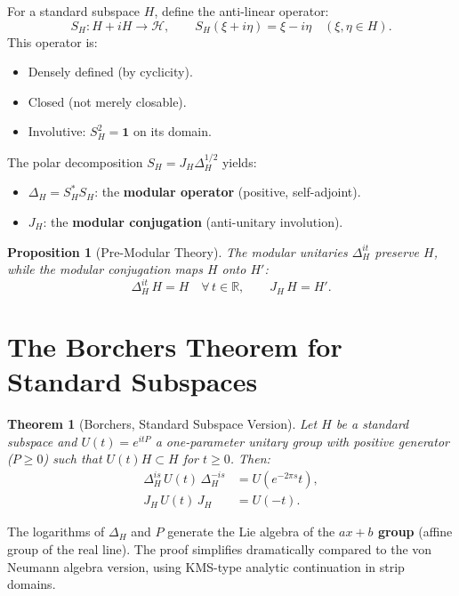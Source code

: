\documentclass[11pt,a4paper]{article}
\newtheorem{theorem}{Theorem}[section]
\newtheorem{proposition}{Proposition}[section]
\begin{document}
For a standard subspace $H$, define the anti-linear operator:
\begin{equation}
  S_H: H + iH \to \mathcal{H}, \qquad S_H(\xi + i\eta) = \xi - i\eta
  \quad (\xi,\eta \in H).
\end{equation}
This operator is:
\begin{itemize}[nosep]
  \item Densely defined (by cyclicity).
  \item Closed (not merely closable).
  \item Involutive: $S_H^2 = \mathbf{1}$ on its domain.
\end{itemize}

The polar decomposition $S_H = J_H \Delta_H^{1/2}$ yields:
\begin{itemize}[nosep]
  \item $\Delta_H = S_H^* S_H$: the \textbf{modular operator} (positive, self-adjoint).
  \item $J_H$: the \textbf{modular conjugation} (anti-unitary involution).
\end{itemize}

\begin{proposition}[Pre-Modular Theory]
The modular unitaries $\Delta_H^{it}$ preserve $H$, while the modular
conjugation maps $H$ onto $H'$:
\[
  \Delta_H^{it}\, H = H \quad\forall\, t \in \mathbb{R},
  \qquad J_H\, H = H'.
\]
\end{proposition}

\section{The Borchers Theorem for Standard Subspaces}

\begin{theorem}[Borchers, Standard Subspace Version]
Let $H$ be a standard subspace and $U(t) = e^{itP}$ a one-parameter
unitary group with positive generator ($P \geq 0$) such that
$U(t)H \subset H$ for $t \geq 0$. Then:
\begin{align}
  \Delta_H^{is}\, U(t)\, \Delta_H^{-is} &= U(e^{-2\pi s} t), \\
  J_H\, U(t)\, J_H &= U(-t).
\end{align}
\end{theorem}

The logarithms of $\Delta_H$ and $P$ generate the Lie algebra of the
\textbf{$ax+b$ group} (affine group of the real line). The proof
simplifies dramatically compared to the von Neumann algebra version,
using KMS-type analytic continuation in strip domains.
\end{document}
